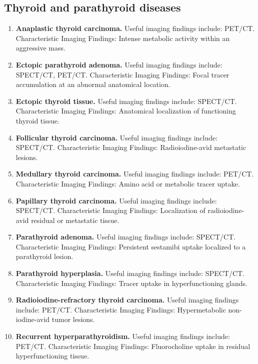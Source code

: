 \subsection{Thyroid and parathyroid diseases}
\begin{enumerate}[leftmargin=*,itemsep=0.45em,topsep=0.4em]
\item \textbf{Anaplastic thyroid carcinoma.} Useful imaging findings include: PET/CT. Characteristic Imaging Findings: Intense metabolic activity within an aggressive mass.
\item \textbf{Ectopic parathyroid adenoma.} Useful imaging findings include: SPECT/CT, PET/CT. Characteristic Imaging Findings: Focal tracer accumulation at an abnormal anatomical location.
\item \textbf{Ectopic thyroid tissue.} Useful imaging findings include: SPECT/CT. Characteristic Imaging Findings: Anatomical localization of functioning thyroid tissue.
\item \textbf{Follicular thyroid carcinoma.} Useful imaging findings include: SPECT/CT. Characteristic Imaging Findings: Radioiodine-avid metastatic lesions.
\item \textbf{Medullary thyroid carcinoma.} Useful imaging findings include: PET/CT. Characteristic Imaging Findings: Amino acid or metabolic tracer uptake.
\item \textbf{Papillary thyroid carcinoma.} Useful imaging findings include: SPECT/CT. Characteristic Imaging Findings: Localization of radioiodine-avid residual or metastatic tissue.
\item \textbf{Parathyroid adenoma.} Useful imaging findings include: SPECT/CT. Characteristic Imaging Findings: Persistent sestamibi uptake localized to a parathyroid lesion.
\item \textbf{Parathyroid hyperplasia.} Useful imaging findings include: SPECT/CT. Characteristic Imaging Findings: Tracer uptake in hyperfunctioning glands.
\item \textbf{Radioiodine-refractory thyroid carcinoma.} Useful imaging findings include: PET/CT. Characteristic Imaging Findings: Hypermetabolic non-iodine-avid tumor lesions.
\item \textbf{Recurrent hyperparathyroidism.} Useful imaging findings include: PET/CT. Characteristic Imaging Findings: Fluorocholine uptake in residual hyperfunctioning tissue.
\end{enumerate}

